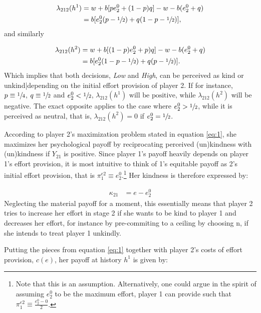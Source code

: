 \vspace{-10mm}\begin{align*}
	\lambda_{212}(h^1) & = w+b[pe^0_2+(1-p)q] - w - b(e^0_2+q)\\
	& = b[e^0_2(p-\sfrac{1}{2})+q(1-p-\sfrac{1}{2})],
\end{align*}
and similarly 

\vspace{-10mm}\begin{align*}
	\lambda_{212}(h^2) & = w+b[(1-p)e^0_2+p)q] - w - b(e^0_2+q)\\
	& = b[e^0_2(1-p-\sfrac{1}{2})+q(p-\sfrac{1}{2})].
\end{align*}
Which implies that both decisions, \textit{Low} and \textit{High}, can be perceived as kind or unkind|depending on the initial effort provision of player 2. If for instance, $p\equiv\sfrac{1}{4}$, $q\equiv\sfrac{1}{2}$ and $e^0_2<\sfrac{1}{2}$, $\lambda_{212}(h^1) \text{ will be positive, while } \lambda_{212}(h^2)$ will be negative. The exact opposite applies to the case where $e^0_2>\sfrac{1}{2}$, while it is perceived as neutral, that is, $\lambda_{212}(h^2)=0$ if $e^0_2=\sfrac{1}{2}$.

According to player 2's maximization problem stated in equation \ref{eq:1}, she maximizes her psychological payoff by reciprocating perceived (un)kindness with (un)kindness if $Y_{21}$ is positive. Since player 1's payoff heavily depends on player 1's effort provision, it is most intuitive to think of 1's equitable payoff as 2's initial effort provision, that is $\pi^{e2}_1\equiv e^0_2$.\footnote{Note that this is an assumption. Alternatively, one could argue in the spirit of \cite{dufwenberg2004GEB, sebald2010GEB} assuming $e^0_2$ to be the maximum effort, player 1 can provide such that $\pi^{e2}_1\equiv \frac{e^0_2-0}{2}$.} Her kindness is therefore expressed by:

\vspace{-10mm}
\begin{align*}
	\kappa_{21} & = e - e^0_2 
\end{align*}
Neglecting the material payoff for a moment, this essentially means that player 2 tries to increase her effort in stage 2 if she wants to be kind to player 1 and decreases her effort, for instance by pre-commiting to a ceiling by choosing n, if she intends to treat player 1 unkindly.

Putting the pieces from equation \ref{eq:1} together with player 2's costs of effort provision, $c(e)$, her payoff at history $h^1$ is given by:

